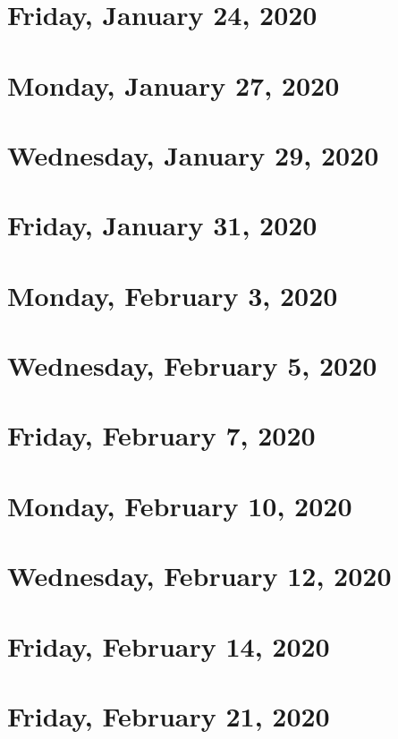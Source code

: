 \documentclass{../mynotes}
\begin{document}
\section{Friday, January 24, 2020}
    

\section{Monday, January 27, 2020}
	
\section{Wednesday, January 29, 2020}
    
\section{Friday, January 31, 2020}
    

\section{Monday, February 3, 2020}
	
\section{Wednesday, February 5, 2020}
    
\section{Friday, February 7, 2020}
    

\section{Monday, February 10, 2020}
	
\section{Wednesday, February 12, 2020}
    
\section{Friday, February 14, 2020}
    
    
\section{Friday, February 21, 2020}
    
\end{document}
